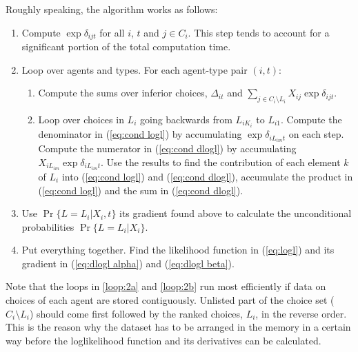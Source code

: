 \documentclass[12pt]{article}
\begin{document}
Roughly speaking, the algorithm works as follows:
\begin{enumerate}
	\item{}Compute $\exp\delta_{ijt}$ for all $i$, $t$ and $j\in C_i$. This step tends to account for a significant portion of the total computation time.
	\item{}Loop over agents and types. For each agent-type pair $(i,t)$:
	\begin{enumerate}
		\item\label{loop:2a} Compute the sums over inferior choices, $\Delta_{it}$ and  $\sum_{j\in{C_i\setminus{L_i}}}X_{ij}\exp{\delta_{ijt}}$.
		\item\label{loop:2b} Loop over choices in $L_i$ going backwards from $L_{iK_i}$ to $L_{i1}$. Compute the denominator in (\ref{eq:cond logl}) by accumulating $\exp\delta_{iL_{im}t}$ on each step. Compute the numerator in (\ref{eq:cond dlogl}) by accumulating $X_{iL_{im}}\exp\delta_{iL_{im}t}$. Use the results to find the contribution of each element $k$ of $L_i$ into (\ref{eq:cond logl}) and (\ref{eq:cond dlogl}), accumulate the product in (\ref{eq:cond logl}) and the sum in (\ref{eq:cond dlogl}).
		 
	\end{enumerate}
	\item{}Use $\Pr\{L=L_i|X_i,t\}$ its gradient found above to calculate the unconditional probabilities $\Pr\{L=L_i|X_i\}$.
	\item Put everything together. Find the likelihood function in (\ref{eq:logl}) and its gradient in (\ref{eq:dlogl alpha}) and (\ref{eq:dlogl beta}).
\end{enumerate}
Note that the loops in \ref{loop:2a} and \ref{loop:2b} run most efficiently if data on choices of each agent are stored contiguously. Unlisted part of the choice set ($C_i\setminus L_i$) should come first followed by the ranked choices, $L_i$, in the reverse order. This is the reason why the dataset has to be arranged in the memory in a certain way before the loglikelihood function and its derivatives can be calculated.
\end{document}
